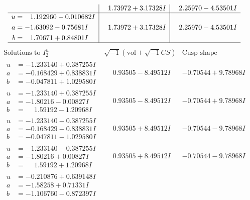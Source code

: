 \documentclass[1p]{elsarticle_modified}
\theoremstyle{definition}
\newcommand{\I}{\sqrt{-1}}
\begin{document}
$$\begin{array}{c|c|c}
 & \phantom{-}1.73972 + 3.17328 I & \phantom{-}2.25970 - 4.53501 I \\ \hline\begin{aligned}
u &= \phantom{-}1.192960 - 0.010682 I \\
a &= -1.63092 - 0.75681 I \\
b &= \phantom{-}1.70671 + 0.84801 I\end{aligned}
 & \phantom{-}1.73972 + 3.17328 I & \phantom{-}2.25970 - 4.53501 I\\
 \hline 
 \end{array}$$\newpage$$\begin{array}{c|c|c}  
\text{Solutions to }I^u_{2}& \I (\text{vol} + \sqrt{-1}CS) & \text{Cusp shape}\\
 \hline 
\begin{aligned}
u &= -1.233140 + 0.387255 I \\
a &= -0.168429 + 0.838831 I \\
b &= -0.047811 + 1.029580 I\end{aligned}
 & \phantom{-}0.93505 - 8.49512 I & -0.70544 + 9.78968 I \\ \hline\begin{aligned}
u &= -1.233140 + 0.387255 I \\
a &= -1.80216 - 0.00827 I \\
b &= \phantom{-}1.59192 - 1.20968 I\end{aligned}
 & \phantom{-}0.93505 - 8.49512 I & -0.70544 + 9.78968 I \\ \hline\begin{aligned}
u &= -1.233140 - 0.387255 I \\
a &= -0.168429 - 0.838831 I \\
b &= -0.047811 - 1.029580 I\end{aligned}
 & \phantom{-}0.93505 + 8.49512 I & -0.70544 - 9.78968 I \\ \hline\begin{aligned}
u &= -1.233140 - 0.387255 I \\
a &= -1.80216 + 0.00827 I \\
b &= \phantom{-}1.59192 + 1.20968 I\end{aligned}
 & \phantom{-}0.93505 + 8.49512 I & -0.70544 - 9.78968 I \\ \hline\begin{aligned}
u &= -0.210876 + 0.639148 I \\
a &= -1.58258 + 0.71331 I \\
b &= -1.106760 - 0.872397 I\end{aligned}

\end{array}$$
\end{document}
